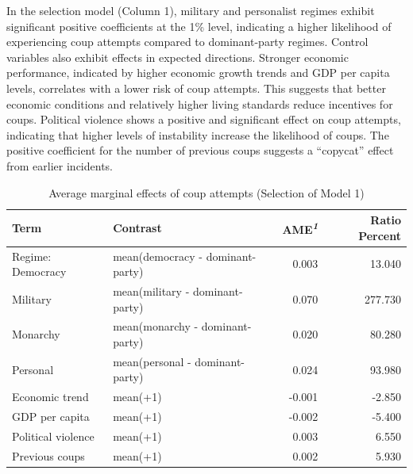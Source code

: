 \documentclass[
  12pt,
]{report}
\begin{document}
In the selection model (Column 1), military and personalist regimes
exhibit significant positive coefficients at the 1\% level, indicating a
higher likelihood of experiencing coup attempts compared to
dominant-party regimes. Control variables also exhibit effects in
expected directions. Stronger economic performance, indicated by higher
economic growth trends and GDP per capita levels, correlates with a
lower risk of coup attempts. This suggests that better economic
conditions and relatively higher living standards reduce incentives for
coups. Political violence shows a positive and significant effect on
coup attempts, indicating that higher levels of instability increase the
likelihood of coups. The positive coefficient for the number of previous
coups suggests a ``copycat'' effect from earlier incidents.

\begingroup
\setlength{}
\setlength{}\fontsize{12.0pt}{14.4pt}\selectfont
\setlength{\LTpost}{0mm}

\begin{longtable}{@{\extracolsep{\fill}}llrr}

\caption{\label{tbl-mfx1}Average marginal effects of coup attempts
(Selection of Model 1)}

\tabularnewline

\toprule
Term & Contrast & AME\textsuperscript{\textit{1}} & Ratio Percent \\ 
\midrule\addlinespace[2.5pt]
Regime: Democracy & mean(democracy - dominant-party) & 0.003 & 13.040 \\ 
{\hspace{47.25pt}Military} & mean(military - dominant-party) & 0.070 & 277.730 \\ 
{\hspace{47.25pt}Monarchy} & mean(monarchy - dominant-party) & 0.020 & 80.280 \\ 
{\hspace{47.25pt}Personal} & mean(personal - dominant-party) & 0.024 & 93.980 \\ 
Economic trend & mean(+1) & -0.001 & -2.850 \\ 
GDP per capita & mean(+1) & -0.002 & -5.400 \\ 
Political violence & mean(+1) & 0.003 & 6.550 \\ 
Previous coups & mean(+1) & 0.002 & 5.930 \\ 
\bottomrule

\end{longtable}
\end{document}

